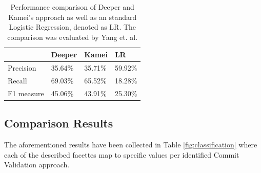 \begin{table}[t]
	\centering
	\begin{tabular}{l|l|l|l|}
		\cline{2-4}
		& Deeper  & Kamei   & LR      \\ \hline
		\multicolumn{1}{|l|}{Precision}  & 35.64\% & 35.71\% & 59.92\% \\ \hline
		\multicolumn{1}{|l|}{Recall}     & 69.03\% & 65.52\% & 18.28\% \\ \hline
		\multicolumn{1}{|l|}{F1 measure} & 45.06\% & 43.91\% & 25.30\% \\ \hline
	\end{tabular}
	\caption{Performance comparison of Deeper and Kamei's approach as well as an standard Logistic Regression, denoted as LR. The comparison was evaluated by Yang et. al. \cite{Yang2015}}
	\label{tab:perfdeeper}
\end{table}



\subsection{Comparison Results}

The aforementioned results have been collected in Table \ref{fig:classification} where each of the described facettes map to specific values per identified Commit Validation approach.

